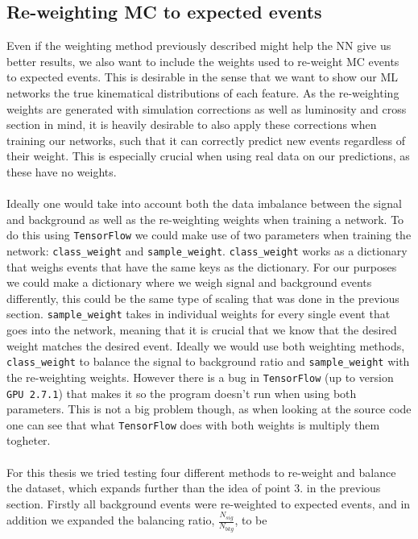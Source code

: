 \documentclass[12pt, a4paper]{book}
\begin{document}
\subsection{Re-weighting MC to expected events}\label{sec:sample_wgts_NN}
Even if the weighting method previously described might help the NN give us better results, we also want to include the weights used to re-weight MC events to expected events. This is desirable in the sense that we want to show our ML networks the true kinematical distributions of each feature.
As the re-weighting weights are generated with simulation corrections as well as luminosity and cross section in mind, it is heavily desirable to also apply these corrections when training our networks, such that it can correctly predict new events regardless of their weight. This is especially 
crucial when using real data on our predictions, as these have no weights.\\
\\Ideally one would take into account both  the data imbalance between the signal and background as well as the re-weighting weights when training a network. To do this using \verb|TensorFlow| we could make use of two parameters when training the network: \verb|class_weight| and \verb|sample_weight|. 
\verb|class_weight| works as a dictionary that weighs events that have the same keys as the dictionary. For our purposes we could make a dictionary where we weigh signal and background events differently, this could be the same type of scaling that was done in the previous section. 
\verb|sample_weight| takes in individual weights for every single event that goes into the network, meaning that it is crucial that we know that the desired weight matches the desired event. Ideally we would use both weighting methods, \verb|class_weight| to balance the signal to 
background ratio and \verb|sample_weight| with the re-weighting weights. However there is a bug in \verb|TensorFlow| (up to version \verb|GPU 2.7.1|) that makes it so the program doesn't run when using both parameters. This is not a big problem though, as when looking at the source code \cite{Keras_source_code} 
one can see that what \verb|TensorFlow| does with both weights is multiply them togheter. \\
\\For this thesis we tried testing four different methods to re-weight and balance the dataset, which expands further than the idea of point 3. in the previous section. Firstly all background events were re-weighted to expected events, and in addition we expanded the balancing ratio, $\frac{N_{sig}}{N_{bkg}}$, to be
\end{document}
